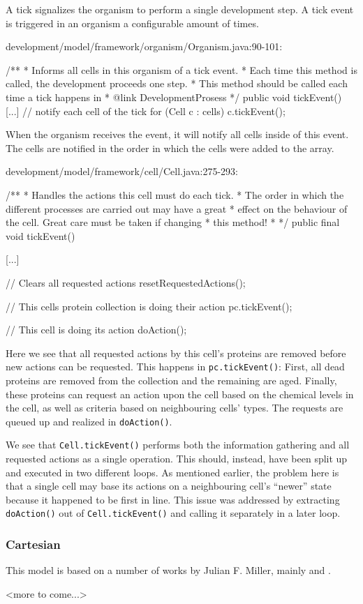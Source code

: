 A tick signalizes the organism to perform a single development step. A tick event is triggered in an organism a configurable amount of times.

\begin{verbatimtab}
development/model/framework/organism/Organism.java:90-101:

/**
 * Informs all cells in this organism of a tick event.
 * Each time this method is called, the development proceeds one step.
 * This method should be called each time a tick happens in
 * {@link DevelopmentProsess}
 */
public void tickEvent() {
	[...]
	// notify each cell of the tick
	for (Cell c : cells) {
		c.tickEvent();
	}
}
\end{verbatimtab}

When the organism receives the event, it will notify all cells inside of this event. The cells are notified in the order in which the cells were added to the array.

\begin{verbatimtab}
development/model/framework/cell/Cell.java:275-293:

/**
 * Handles the actions this cell must do each tick.
 * The order in which the different processes are carried out may have a great
 * effect on the behaviour of the cell. Great care must be taken if changing
 * this method!
 *
 */
public final void tickEvent() {
	[...]

	// Clears all requested actions
	resetRequestedActions();

	// This cells protein collection is doing their action
	pc.tickEvent();

	// This cell is doing its action
	doAction();
}
\end{verbatimtab}

Here we see that all requested actions by this cell's proteins are removed before new actions can be requested. This happens in \texttt{pc.tickEvent()}: First, all dead proteins are removed from the collection and the remaining are aged. Finally, these proteins can request an action upon the cell based on the chemical levels in the cell, as well as criteria based on neighbouring cells' types. The requests are queued up and realized in \texttt{doAction()}.

We see that \texttt{Cell.tickEvent()} performs both the information gathering and all requested actions as a single operation. This should, instead, have been split up and executed in two different loops. As mentioned earlier, the problem here is that a single cell may base its actions on a neighbouring cell's ``newer'' state because it happened to be first in line. This issue was addressed by extracting \texttt{doAction()} out of \texttt{Cell.tickEvent()} and calling it separately in a later loop.

\subsubsection{Cartesian}
This model is based on a number of works by Julian F. Miller, mainly \cite{mteurogp2000} and \cite{ecal2003}. 

<more to come...>

